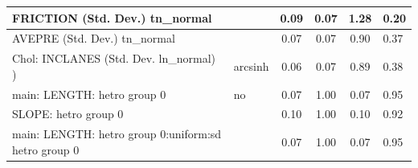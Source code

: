 \begin{table}
\begin{center}
\begin{tabular}{|l|l|c|c|c|l|}
			\hline
			FRICTION (Std. Dev.) tn_normal &  & 0.09 & 0.07 & 1.28 & 0.20 \\
			\hline
			AVEPRE (Std. Dev.) tn_normal &  & 0.07 & 0.07 & 0.90 & 0.37 \\
			\hline
			 Chol: INCLANES (Std. Dev. ln_normal) ) & arcsinh & 0.06 & 0.07 & 0.89 & 0.38 \\
			\hline
			main: LENGTH: hetro group 0 & no & 0.07 & 1.00 & 0.07 & 0.95 \\
			\hline
			SLOPE: hetro group 0 &  & 0.10 & 1.00 & 0.10 & 0.92 \\
			\hline
			main: LENGTH: hetro group 0:uniform:sd  hetro group 0 &  & 0.07 & 1.00 & 0.07 & 0.95 \\
			\hline
		\end{tabular}
	\end{center}
\end{table}